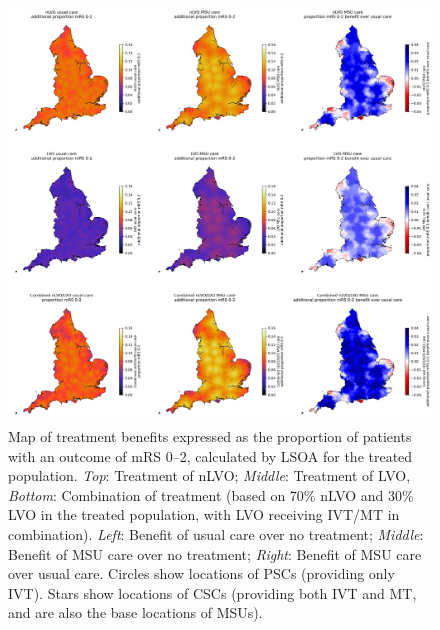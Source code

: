 \begin{figure}[h!]
    \centering
    \includegraphics[width=1\linewidth]{images/map_mrs_0_2.jpg}
    \caption{Map of treatment benefits expressed as the proportion of patients with an outcome of mRS 0--2, calculated by LSOA for the treated population. \textit{Top}: Treatment of nLVO; \textit{Middle}: Treatment of LVO, \textit{Bottom}: Combination of treatment (based on 70\% nLVO and 30\% LVO in the treated population, with LVO receiving IVT/MT in combination). \textit{Left}: Benefit of usual care over no treatment; \textit{Middle}: Benefit of MSU care over no treatment; \textit{Right}: Benefit of MSU care over usual care. Circles show locations of PSCs (providing only IVT). Stars show locations of CSCs (providing both IVT and MT, and are also the base locations of MSUs).}
    \label{fig:msu_map_mrs_0_2}
\end{figure}

